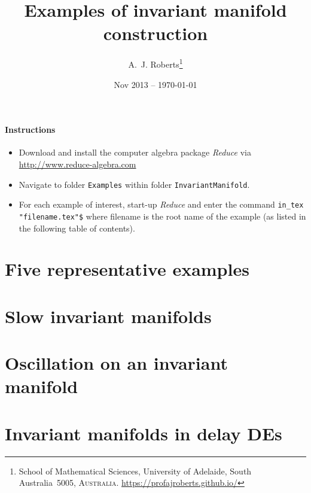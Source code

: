 \documentclass[11pt,a4paper]{refart}
\title{Examples of invariant manifold construction}
\author{A.~J. Roberts\thanks{School of Mathematical Sciences, University of Adelaide, South Australia~5005, \textsc{Australia}.
\url{https://profajroberts.github.io/}}}
\date{Nov 2013 -- \today}
\begin{document}
\maketitle


\paragraph{Instructions}
\begin{itemize}
\item Download and install the computer algebra package
\emph{Reduce} via \url{http://www.reduce-algebra.com}

\item Navigate to folder \verb|Examples| within folder \verb|InvariantManifold|.

\item For each example of interest, start-up \emph{Reduce} and enter the command \verb|in_tex "filename.tex"$|  where filename is the root name of the example (as listed in the following table of contents).

\end{itemize}


\tableofcontents




\section{Five representative examples}












\section{Slow invariant manifolds}







\section{Oscillation on an invariant manifold}









\section{Invariant manifolds in delay DEs}







\end{document}
